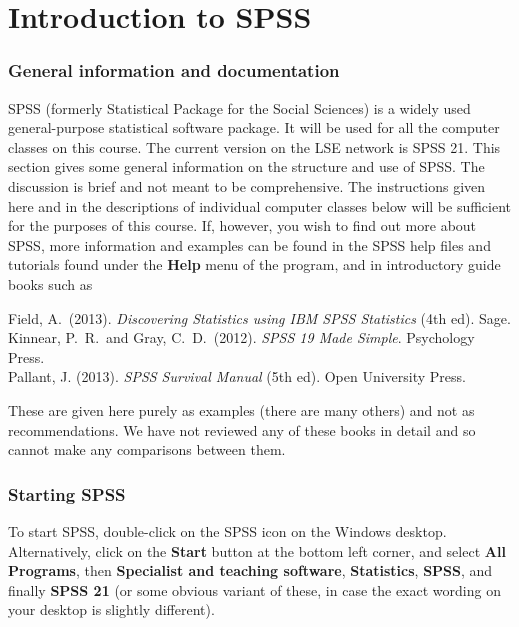 \section{Introduction to SPSS}


\subsubsection{General information and documentation}

SPSS (formerly Statistical Package for the Social Sciences) is a widely
used general-purpose statistical software package. It will be used for
all the computer classes on this course. The current version on the  LSE
network is SPSS 21. This section gives some general information on the
structure and use of SPSS. The discussion is brief and not meant to
be comprehensive. The instructions given here and in the descriptions of
individual computer classes below will be sufficient for the purposes of
this course. If, however, you wish to find out more about SPSS, more information
and examples can be found in
the SPSS help files and tutorials found under the \textbf{Help} menu of
the program, and in introductory
guide books such as\label{p_spssbooks}

Field, A.\ (2013). \emph{Discovering Statistics using IBM SPSS
Statistics} (4th ed). Sage.\\
Kinnear, P.\ R.\ and Gray, C.\ D.\ (2012). \emph{SPSS 19 Made Simple}.
Psychology Press.\\
Pallant, J. (2013). \emph{SPSS Survival Manual} (5th ed). Open
University Press.

These are given here purely as examples (there are many others) and not
as recommendations. We have not reviewed any of these books in detail
and so cannot make any comparisons between them.

\subsubsection{Starting SPSS}

To start SPSS, double-click on the SPSS icon on the Windows desktop.
Alternatively, click on the \textbf{Start} button at the
bottom left corner, and select \textbf{All Programs}, then
\textbf{Specialist and teaching software}, \textbf{Statistics}, \textbf{SPSS}, and finally
\textbf{SPSS 21}
(or some obvious
variant of these, in case the exact wording on your desktop is slightly
different).

